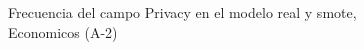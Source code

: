 \begin{figure}[H]
    \centering
    
    \caption{Frecuencia del campo Privacy en el modelo real y smote, Economicos (A-2)}
    \label{frecuency-Privacy-smote-enc}
\end{figure}